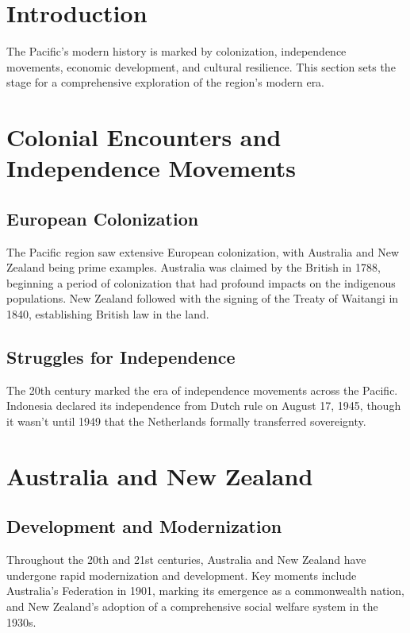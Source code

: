 \documentclass[a4paper,12pt]{book}
\begin{document}
\section{Introduction}
\label{sec:introduction-modern-pacific}
The Pacific's modern history is marked by colonization, independence movements, economic development, and cultural resilience. This section sets the stage for a comprehensive exploration of the region’s modern era.

\section{Colonial Encounters and Independence Movements}
\label{sec:colonial-independence}

\subsection{European Colonization}
\label{subsec:european-colonization}
The Pacific region saw extensive European colonization, with Australia and New Zealand being prime examples. Australia was claimed by the British in 1788, beginning a period of colonization that had profound impacts on the indigenous populations. New Zealand followed with the signing of the Treaty of Waitangi in 1840, establishing British law in the land.

\subsection{Struggles for Independence}
\label{subsec:independence-movements}
The 20th century marked the era of independence movements across the Pacific. Indonesia declared its independence from Dutch rule on August 17, 1945, though it wasn’t until 1949 that the Netherlands formally transferred sovereignty.

\section{Australia and New Zealand}
\label{sec:australia-newzealand}

\subsection{Development and Modernization}
\label{subsec:development-modernization}
Throughout the 20th and 21st centuries, Australia and New Zealand have undergone rapid modernization and development. Key moments include Australia’s Federation in 1901, marking its emergence as a commonwealth nation, and New Zealand’s adoption of a comprehensive social welfare system in the 1930s.
\end{document}
